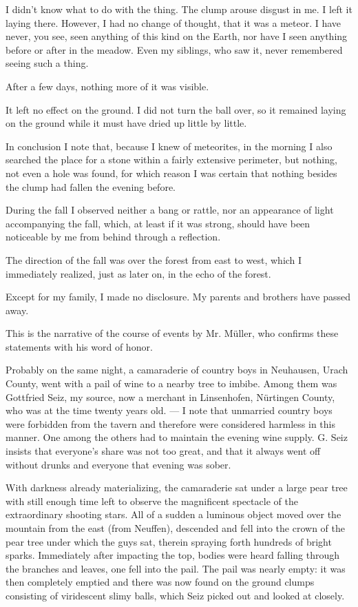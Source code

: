 \documentclass[a4paper, 12pt, oneside]{article}
\begin{document}
I didn't know what to do with the thing. The clump arouse disgust in me. I left it laying there. However, I had no change of thought, that it was a meteor. I have never, you see, seen anything of this kind on the Earth, nor have I seen anything before or after in the meadow. Even my siblings, who saw it, never remembered seeing such a thing.

After a few days, nothing more of it was visible.

It left no effect on the ground. I did not turn the ball over, so it remained laying on the ground while it must have dried up little by little.

In conclusion I note that, because I knew of meteorites, in the morning I also searched the place for a stone within a fairly extensive perimeter, but nothing, not even a hole was found, for which reason I was certain that nothing besides the clump had fallen the evening before.

During the fall I observed neither a bang or rattle, nor an appearance of light accompanying the fall, which, at least if it was strong, should have been noticeable by me from behind through a reflection.

The direction of the fall was over the forest from east to west, which I immediately realized, just as later on, in the echo of the forest.

Except for my family, I made no disclosure. My parents and brothers have passed away.

This is the narrative of the course of events by Mr. Müller, who confirms these statements with his word of honor.

Probably on the same night, a camaraderie of country boys in Neuhausen, Urach County, went with a pail of wine to a nearby tree to imbibe. Among them was Gottfried Seiz, my source, now a merchant in Linsenhofen, Nürtingen County, who was at the time twenty years old. — I note that unmarried country boys were forbidden from the tavern and therefore were considered harmless in this manner. One among the others had to maintain the evening wine supply. G. Seiz insists that everyone's share was not too great, and that it always went off without drunks and everyone that evening was sober.

With darkness already materializing, the camaraderie sat under a large pear tree with still enough time left to observe the magnificent spectacle of the extraordinary shooting stars. All of a sudden a luminous object moved over the mountain from the east (from Neuffen), descended and fell into the crown of the pear tree under which the guys sat, therein spraying forth hundreds of bright sparks. Immediately after impacting the top, bodies were heard falling through the branches and leaves, one fell into the pail. The pail was nearly empty: it was then completely emptied and there was now found on the ground clumps consisting of viridescent slimy balls, which Seiz picked out and looked at closely.
\end{document}
